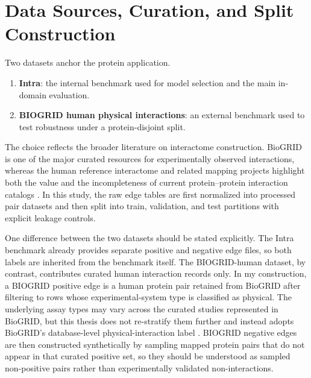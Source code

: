 \section[Data Sources and Splits]{Data Sources, Curation, and Split Construction}

Two datasets anchor the protein application.
\begin{enumerate}
    \item \textbf{Intra}: the internal benchmark used for model selection and the main in-domain evaluation.
    \item \textbf{BIOGRID human physical interactions}: an external benchmark used to test robustness under a protein-disjoint split.
\end{enumerate}

The choice reflects the broader literature on interactome construction. BioGRID is one of the major curated resources for experimentally observed interactions, whereas the human reference interactome and related mapping projects highlight both the value and the incompleteness of current protein--protein interaction catalogs \parencite{vidal2011, biogrid2019, luck2020}. In this study, the raw edge tables are first normalized into processed pair datasets and then split into train, validation, and test partitions with explicit leakage controls.

One difference between the two datasets should be stated explicitly. The Intra benchmark already provides separate positive and negative edge files, so both labels are inherited from the benchmark itself. The BIOGRID-human dataset, by contrast, contributes curated human interaction records only. In my construction, a BIOGRID positive edge is a human protein pair retained from BioGRID after filtering to rows whose experimental-system type is classified as physical. The underlying assay types may vary across the curated studies represented in BioGRID, but this thesis does not re-stratify them further and instead adopts BioGRID's database-level physical-interaction label \parencite{biogrid2019}. BIOGRID negative edges are then constructed synthetically by sampling mapped protein pairs that do not appear in that curated positive set, so they should be understood as sampled non-positive pairs rather than experimentally validated non-interactions.

